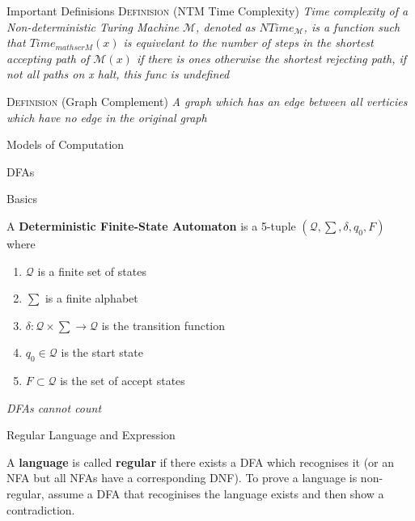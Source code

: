 \documentclass[12pt, letterpaper]{article}
\begin{document}
\begin{section}{Important Definisions}
  \textsc{Definision} (NTM Time Complexity) \textit{Time complexity
    of a Non-deterministic Turing Machine \(\mathscr{M}\), denoted as \(NTime_{\mathscr{M}}\),
    is a function such that \(Time_{mathscr{M}}(x)\) is equivelant to the
    number of steps in the shortest accepting path of \(\mathscr{M}(x)\) if there is ones
    otherwise the shortest rejecting path, if not all paths on x halt, this func is undefined}

  \textsc{Definision} (Graph Complement) \textit{A graph which has an edge
    between all verticies which have no edge in the original graph}

\end{section}

\begin{section}{Models of Computation}

  \begin{subsection}{DFAs}

    \begin{subsubsection}{Basics}

      A \textbf{Deterministic Finite-State Automaton} is a 5-tuple
      \((\mathcal{Q}, \sum, \delta, q_{0}, F)\) where
      \begin{enumerate}
        \item \(\mathcal{Q}\) is a finite set of states
        \item \(\sum\) is a finite alphabet
        \item \(\delta: \mathcal{Q} \times \sum \to \mathcal{Q}\) is the
              transition function
        \item \(q_{0} \in \mathcal{Q}\) is the start state
        \item \(F \subset \mathcal{Q}\) is the set of accept states
      \end{enumerate}

      \emph{DFAs cannot count}

    \end{subsubsection}

    \begin{subsubsection}{Regular Language and Expression}

      A \textbf{language} is called \textbf{regular} if there exists a DFA which
      recognises it (or an NFA but all NFAs have a corresponding DNF).
      To prove a language is non-regular, assume a DFA that recoginises the
      language exists and then show a contradiction.


\end{subsubsection}
\end{subsection}
\end{section}
\end{document}
